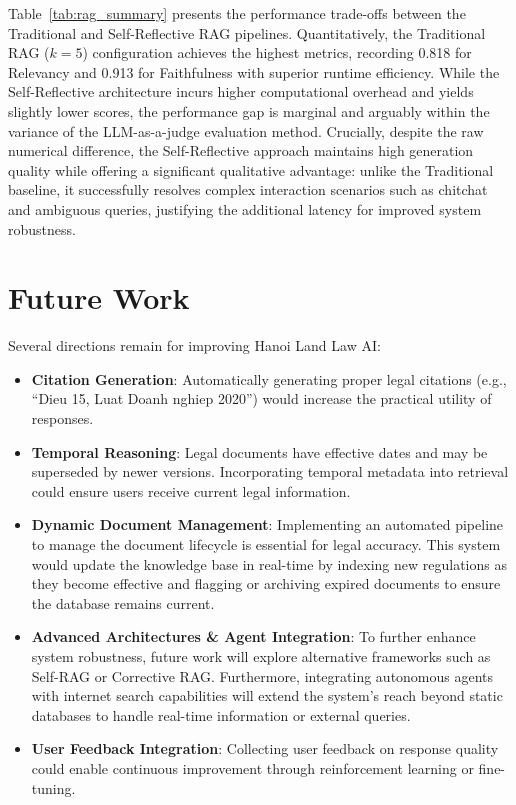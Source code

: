 \documentclass[letterpaper]{article} %
\begin{document}
Table~\ref{tab:rag_summary} presents the performance trade-offs between the Traditional and Self-Reflective RAG pipelines. Quantitatively, the Traditional RAG ($k=5$) configuration achieves the highest metrics, recording 0.818 for Relevancy and 0.913 for Faithfulness with superior runtime efficiency. While the Self-Reflective architecture incurs higher computational overhead and yields slightly lower scores, the performance gap is marginal and arguably within the variance of the LLM-as-a-judge evaluation method. Crucially, despite the raw numerical difference, the Self-Reflective approach maintains high generation quality while offering a significant qualitative advantage: unlike the Traditional baseline, it successfully resolves complex interaction scenarios such as chitchat and ambiguous queries, justifying the additional latency for improved system robustness.

\section{Future Work}

Several directions remain for improving Hanoi Land Law AI:

\begin{itemize}
    \item \textbf{Citation Generation}: Automatically generating proper legal citations (e.g., ``Dieu 15, Luat Doanh nghiep 2020'') would increase the practical utility of responses.

    \item \textbf{Temporal Reasoning}: Legal documents have effective dates and may be superseded by newer versions. Incorporating temporal metadata into retrieval could ensure users receive current legal information.

    \item \textbf{Dynamic Document Management}: Implementing an automated pipeline to manage the document lifecycle is essential for legal accuracy. This system would update the knowledge base in real-time by indexing new regulations as they become effective and flagging or archiving expired documents to ensure the database remains current.

    \item \textbf{Advanced Architectures \& Agent Integration}: To further enhance system robustness, future work will explore alternative frameworks such as Self-RAG or Corrective RAG. Furthermore, integrating autonomous agents with internet search capabilities will extend the system's reach beyond static databases to handle real-time information or external queries.

    \item \textbf{User Feedback Integration}: Collecting user feedback on response quality could enable continuous improvement through reinforcement learning or fine-tuning.
\end{itemize}
\end{document}

